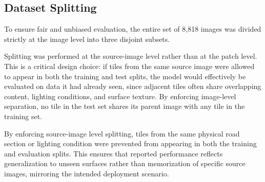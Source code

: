 \subsection{Dataset Splitting}
\label{subsec:dataset_splitting}
\hs To ensure fair and unbiased evaluation, the entire set of 8,818 images was divided strictly at the image level into three disjoint subsets.

\hs Splitting was performed at the source-image level rather than at the patch level. This is a critical design choice: if tiles from the same source image were allowed to appear in both the training and test splits, the model would effectively be evaluated on data it had already seen, since adjacent tiles often share overlapping content, lighting conditions, and surface texture. By enforcing image-level separation, no tile in the test set shares its parent image with any tile in the training set.

\begin{table}[htbp]
    \centering
    \caption{\textit{Summary of public crack dataset partition.}}
    \label{tab:dataset_split}
    \renewcommand{\arraystretch}{1.1}
\end{table}

\hs By enforcing source-image level splitting, tiles from the same physical road section or lighting condition were prevented from appearing in both the training and evaluation splits. This ensures that reported performance reflects generalization to unseen surfaces rather than memorization of specific source images, mirroring the intended deployment scenario.

